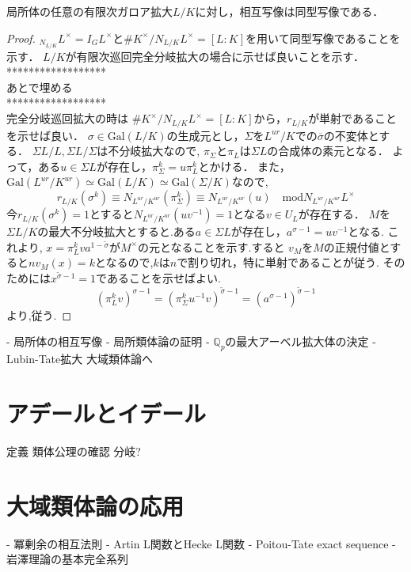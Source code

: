 \documentclass{ujarticle}
\begin{document}
\begin{thm}
 局所体の任意の有限次ガロア拡大$L/K$に対し，相互写像は同型写像である．
\end{thm}
\begin{proof}
$ _{N_{L/K}}L^{\times} = I_G L^{\times}$と$\# K^{\times}/N_{L/K}L^{\times} =[L:K]$を用いて同型写像であることを示す．
$L/K$が有限次巡回完全分岐拡大の場合に示せば良いことを示す．
******************\\
あとで埋める \\
******************\\
完全分岐巡回拡大の時は
$\# K^{\times}/N_{L/K}L^{\times} =[L:K]$から，$r_{L/K}$が単射であることを示せば良い．
$\sigma \in \mathrm{Gal}(L/K)$の生成元とし，$\Sigma$を$L^{ur}/K$での$\overline{\sigma}$の不変体とする．
$\Sigma L/L,\Sigma L/\Sigma$は不分岐拡大なので,
$\pi_{\Sigma}$と$\pi_L$は$\Sigma L$の合成体の素元となる．
よって，ある$u \in \Sigma L$が存在し，$\pi_{\Sigma}^k = u \pi_L^k$とかける．
また，$\mathrm{Gal}(L^{ur}/K^{ur}) \simeq \mathrm{Gal}(L/K) \simeq \mathrm{Gal}(\Sigma/K)$なので,
\begin{equation*}
 r_{L/K}(\sigma^k) \equiv N_{L^{ur}/K^{ur}}(\pi_{\Sigma}^k) \equiv N_{L^{ur}/K^{ur}}(u) \quad \mbox{mod} N_{L^{ur}/K^{ur}}L^{\times}
\end{equation*}
今$r_{L/K}(\sigma^k)=1$とすると$N_{L^{ur}/K^{ur}}(uv^{-1})=1$となる$v \in U_L$が存在する．
$M$を$\Sigma L/K$の最大不分岐拡大とすると.ある$a \in \Sigma L$が存在し，$ a^{\sigma -1}= uv^{-1}$となる.
これより,
$x=\pi_L^kva^{1-\tilde{\sigma}}$が$M^{\times}$の元となることを示す.すると
$v_M$を$M$の正規付値とすると$nv_M(x)=k$となるので,$k$は$n$で割り切れ，特に単射であることが従う.
そのためには$x^{\tilde{\sigma} -1} =1$であることを示せばよい.
\begin{equation*}
(\pi_L^kv)^{\sigma -1}= (\pi_{\Sigma}^ku^{-1}v)^{\tilde{\sigma}-1} =(a^{\sigma -1})^{\tilde{\sigma}-1}
\end{equation*}
より,従う.
\end{proof}


- 局所体の相互写像
- 局所類体論の証明
- $\mathbb{Q}_p$の最大アーベル拡大体の決定
- Lubin-Tate拡大
大域類体論へ

\section{アデールとイデール}
\label{sec:アデールとイデール}
定義
類体公理の確認
分岐?

\section{大域類体論の応用}
\label{sec:大域類体論の応用}
- 冪剰余の相互法則
- Artin L関数とHecke L関数
- Poitou-Tate exact sequence
- 岩澤理論の基本完全系列
\end{document}
